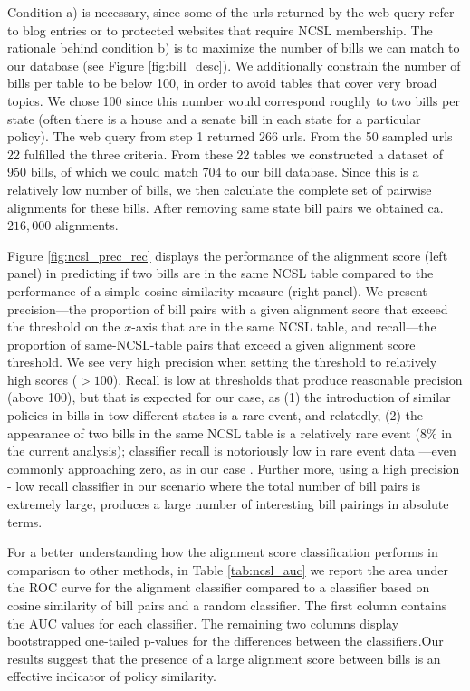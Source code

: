 \documentclass[12pt]{article} %
\begin{document}
Condition a) is necessary, since some of the urls returned by the web query refer to blog entries or to protected websites that require NCSL membership. The rationale behind condition b) is to maximize the number of bills we can match to our database (see Figure \ref{fig:bill_desc}). We additionally constrain the number of bills per table to be below 100, in order to avoid tables that cover very broad topics. We chose 100 since this number would correspond roughly to two bills per state (often there is a house and a senate bill in each state for a particular policy).
The web query from step 1 returned 266 urls. From the 50 sampled urls 22
fulfilled the three criteria. From these 22 tables we constructed a dataset of
950 bills, of which we could match 704 to our bill database. Since this is a
relatively low number of bills, we then calculate the complete set of pairwise
alignments for these bills. After removing same state bill pairs we obtained ca. $216,000$ alignments.

Figure \ref{fig:ncsl_prec_rec} displays the performance of the alignment score (left panel)
in predicting if two bills are in the same NCSL table compared to the performance of a simple cosine similarity measure (right panel). We present
precision---the proportion of bill pairs with a given alignment score that
exceed the threshold on the $x$-axis that are in the same NCSL table, and
recall---the proportion of same-NCSL-table pairs that exceed a given alignment
score threshold. We see very high precision when setting the threshold to
relatively high scores ($>100$). Recall is low at thresholds that produce
reasonable precision (above 100), but that is expected for our case, as
(1) the introduction of similar policies in bills in tow different states is a
rare event, and relatedly, (2) the appearance of two bills in the same NCSL
table is a relatively rare event (8\% in the current analysis); classifier
recall is notoriously low in rare event data \citep{weiss2000learning}---even
commonly approaching zero, as in our case \citep{weiss2004mining}. Further more,
using a high precision - low recall classifier in our scenario where the total
number of bill pairs is extremely large, produces a large number of interesting
bill pairings in absolute terms. 



For a better understanding how the alignment score classification performs in
comparison to other methods, in Table \ref{tab:ncsl_auc} we report the area under the ROC curve for the
alignment classifier compared to a classifier based on cosine similarity of bill
pairs and a random classifier. The first column contains the AUC values for each
classifier. The remaining two columns display bootstrapped one-tailed p-values for the
differences between the classifiers.Our results suggest that the presence of a large alignment score between bills is an effective indicator of policy similarity. 
\end{document}
